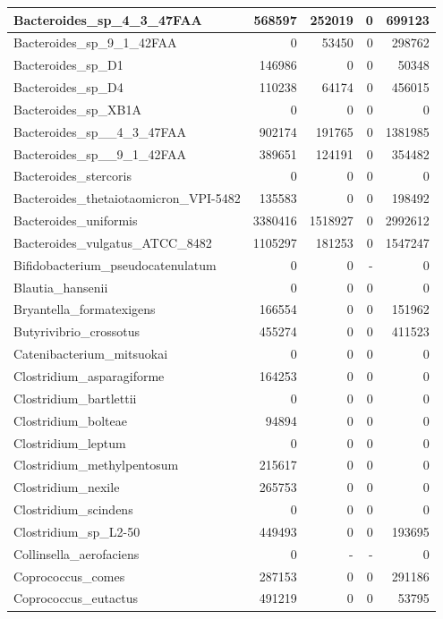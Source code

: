 \documentclass[12pt,a4paper]{article}
\begin{document}
\begin{table}[ht]
\begin{center}
\begin{tabular}{|l*{4}{|r}|}
Bacteroides\_sp\_4\_3\_47FAA & 568597 & 252019 & 0 & 699123 \\ \hline
Bacteroides\_sp\_9\_1\_42FAA & 0 & 53450 & 0 & 298762 \\ \hline
Bacteroides\_sp\_D1 & 146986 & 0 & 0 & 50348 \\ \hline
Bacteroides\_sp\_D4 & 110238 & 64174 & 0 & 456015 \\ \hline
Bacteroides\_sp\_XB1A & 0 & 0 & 0 & 0 \\ \hline
Bacteroides\_sp\_\_4\_3\_47FAA & 902174 & 191765 & 0 & 1381985 \\ \hline
Bacteroides\_sp\_\_9\_1\_42FAA & 389651 & 124191 & 0 & 354482 \\ \hline
Bacteroides\_stercoris & 0 & 0 & 0 & 0 \\ \hline
Bacteroides\_thetaiotaomicron\_VPI-5482 & 135583 & 0 & 0 & 198492 \\ \hline
Bacteroides\_uniformis & 3380416 & 1518927 & 0 & 2992612 \\ \hline
Bacteroides\_vulgatus\_ATCC\_8482 & 1105297 & 181253 & 0 & 1547247 \\ \hline
Bifidobacterium\_pseudocatenulatum & 0 & 0 & - & 0 \\ \hline
Blautia\_hansenii & 0 & 0 & 0 & 0 \\ \hline
Bryantella\_formatexigens & 166554 & 0 & 0 & 151962 \\ \hline
Butyrivibrio\_crossotus & 455274 & 0 & 0 & 411523 \\ \hline
Catenibacterium\_mitsuokai & 0 & 0 & 0 & 0 \\ \hline
Clostridium\_asparagiforme & 164253 & 0 & 0 & 0 \\ \hline
Clostridium\_bartlettii & 0 & 0 & 0 & 0 \\ \hline
Clostridium\_bolteae & 94894 & 0 & 0 & 0 \\ \hline
Clostridium\_leptum & 0 & 0 & 0 & 0 \\ \hline
Clostridium\_methylpentosum & 215617 & 0 & 0 & 0 \\ \hline
Clostridium\_nexile & 265753 & 0 & 0 & 0 \\ \hline
Clostridium\_scindens & 0 & 0 & 0 & 0 \\ \hline
Clostridium\_sp\_L2-50 & 449493 & 0 & 0 & 193695 \\ \hline
Collinsella\_aerofaciens & 0 & - & - & 0 \\ \hline
Coprococcus\_comes & 287153 & 0 & 0 & 291186 \\ \hline
Coprococcus\_eutactus & 491219 & 0 & 0 & 53795 \\ \hline

\end{tabular}
\end{center}
\end{table}
\end{document}
